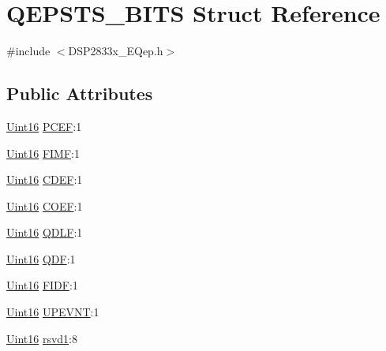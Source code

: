 \hypertarget{struct_q_e_p_s_t_s___b_i_t_s}{}\section{Q\+E\+P\+S\+T\+S\+\_\+\+B\+I\+T\+S Struct Reference}
\label{struct_q_e_p_s_t_s___b_i_t_s}


{\ttfamily \#include $<$D\+S\+P2833x\+\_\+\+E\+Qep.\+h$>$}

\subsection*{Public Attributes}
\begin{DoxyCompactItemize}
\item 
\hyperlink{_d_s_p2833x___device_8h_a59a9f6be4562c327cbfb4f7e8e18f08b}{Uint16} \hyperlink{struct_q_e_p_s_t_s___b_i_t_s_a88c6d2960f4a2abd796907553a4a9df7}{P\+C\+E\+F}\+:1
\item 
\hyperlink{_d_s_p2833x___device_8h_a59a9f6be4562c327cbfb4f7e8e18f08b}{Uint16} \hyperlink{struct_q_e_p_s_t_s___b_i_t_s_a6edd91f36c705a88ca5fd7ba59912de8}{F\+I\+M\+F}\+:1
\item 
\hyperlink{_d_s_p2833x___device_8h_a59a9f6be4562c327cbfb4f7e8e18f08b}{Uint16} \hyperlink{struct_q_e_p_s_t_s___b_i_t_s_a184a49426085e7c11df143ec49e50031}{C\+D\+E\+F}\+:1
\item 
\hyperlink{_d_s_p2833x___device_8h_a59a9f6be4562c327cbfb4f7e8e18f08b}{Uint16} \hyperlink{struct_q_e_p_s_t_s___b_i_t_s_a32d22cf271ede895da4e7354ab933b41}{C\+O\+E\+F}\+:1
\item 
\hyperlink{_d_s_p2833x___device_8h_a59a9f6be4562c327cbfb4f7e8e18f08b}{Uint16} \hyperlink{struct_q_e_p_s_t_s___b_i_t_s_aad27f808c4e21d5bb9bf7054702090be}{Q\+D\+L\+F}\+:1
\item 
\hyperlink{_d_s_p2833x___device_8h_a59a9f6be4562c327cbfb4f7e8e18f08b}{Uint16} \hyperlink{struct_q_e_p_s_t_s___b_i_t_s_a623d6a4592f51d93a8f58f76ddf8f041}{Q\+D\+F}\+:1
\item 
\hyperlink{_d_s_p2833x___device_8h_a59a9f6be4562c327cbfb4f7e8e18f08b}{Uint16} \hyperlink{struct_q_e_p_s_t_s___b_i_t_s_a8465a2eafbeefd200c211b2576ad74b9}{F\+I\+D\+F}\+:1
\item 
\hyperlink{_d_s_p2833x___device_8h_a59a9f6be4562c327cbfb4f7e8e18f08b}{Uint16} \hyperlink{struct_q_e_p_s_t_s___b_i_t_s_a70a730f0ccf3e87297a407d4eaf92abb}{U\+P\+E\+V\+N\+T}\+:1
\item 
\hyperlink{_d_s_p2833x___device_8h_a59a9f6be4562c327cbfb4f7e8e18f08b}{Uint16} \hyperlink{struct_q_e_p_s_t_s___b_i_t_s_a67721f711d89ea7fce60b09b795835e5}{rsvd1}\+:8
\end{DoxyCompactItemize}



